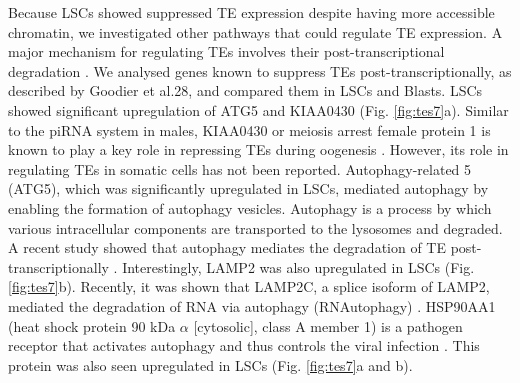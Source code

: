 Because LSCs showed suppressed TE expression despite having more accessible chromatin, we investigated other pathways that could regulate TE expression. A major mechanism for regulating TEs involves their post-transcriptional degradation \cite{Goodier2012,Goodier2013}. We analysed genes known to suppress TEs post-transcriptionally, as described by Goodier et al.\cite{Goodier2016}28, and compared them in LSCs and Blasts. LSCs showed significant upregulation of ATG5 and KIAA0430 (Fig. \ref{fig:tes7}a). Similar to the piRNA system in males, KIAA0430 or meiosis arrest female protein 1 is known to play a key role in repressing TEs during oogenesis \cite{Su2012}. However, its role in regulating TEs in somatic cells has not been reported. Autophagy-related 5 (ATG5), which was significantly upregulated in LSCs, mediated autophagy by enabling the formation of autophagy vesicles. Autophagy is a process by which various intracellular components are transported to the lysosomes and degraded. A recent study showed that autophagy mediates the degradation of TE post-transcriptionally \cite{Guo2014}. Interestingly, LAMP2 was also upregulated in LSCs (Fig. \ref{fig:tes7}b). Recently, it was shown that LAMP2C, a splice isoform of LAMP2, mediated the degradation of RNA via autophagy (RNAutophagy) \cite{Fujiwara2013, Fujiwara2015, Hase2015}. HSP90AA1 (heat shock protein 90 kDa $\alpha$ [cytosolic], class A member 1) is a pathogen receptor that activates autophagy and thus controls the viral infection \cite{Hu2015}. This protein was also seen upregulated in LSCs (Fig. \ref{fig:tes7}a and b).

